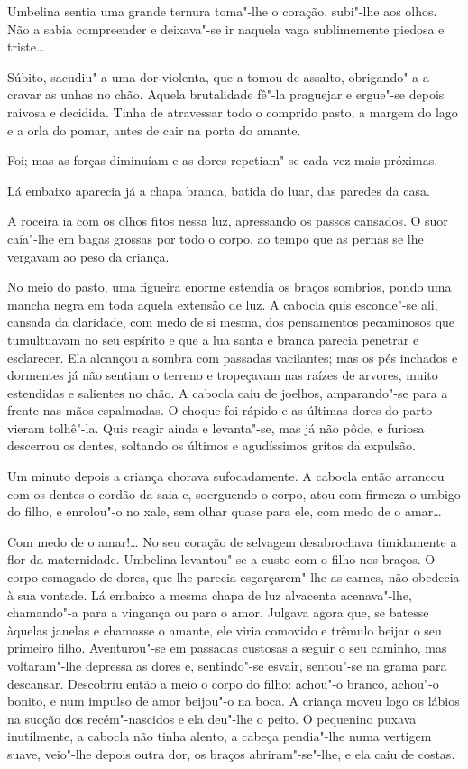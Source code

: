 Umbelina sentia uma grande ternura toma"-lhe o coração, subi"-lhe aos
olhos. Não a sabia compreender e deixava"-se ir naquela vaga sublimemente
piedosa e triste\ldots{}

Súbito, sacudiu"-a uma dor violenta, que a tomou de assalto, obrigando"-a
a cravar as unhas no chão. Aquela brutalidade fê"-la praguejar e
ergue"-se depois raivosa e decidida. Tinha de atravessar todo o comprido
pasto, a margem do lago e a orla do pomar, antes de cair na porta do
amante.

Foi; mas as forças diminuíam e as dores repetiam"-se cada vez mais
próximas.

Lá embaixo aparecia já a chapa branca, batida do luar, das paredes da
casa.

A roceira ia com os olhos fitos nessa luz, apressando os passos
cansados. O suor caía"-lhe em bagas grossas por todo o corpo, ao tempo
que as pernas se lhe vergavam ao peso da criança.

No meio do pasto, uma figueira enorme estendia os braços sombrios, pondo
uma mancha negra em toda aquela extensão de luz. A cabocla quis
esconde"-se ali, cansada da claridade, com medo de si mesma, dos
pensamentos pecaminosos que tumultuavam no seu espírito e que a lua
santa e branca parecia penetrar e esclarecer. Ela alcançou a sombra com
passadas vacilantes; mas os pés inchados e dormentes já não sentiam o
terreno e tropeçavam nas raízes de arvores, muito estendidas e salientes
no chão. A cabocla caiu de joelhos, amparando"-se para a frente nas mãos
espalmadas. O choque foi rápido e as últimas dores do parto vieram
tolhê"-la. Quis reagir ainda e levanta"-se, mas já não pôde, e furiosa
descerrou os dentes, soltando os últimos e agudíssimos gritos da
expulsão.

Um minuto depois a criança chorava sufocadamente. A cabocla então
arrancou com os dentes o cordão da saia e, soerguendo o corpo, atou com
firmeza o umbigo do filho, e enrolou"-o no xale, sem olhar quase para
ele, com medo de o amar\ldots{}

Com medo de o amar!\ldots{} No seu coração de selvagem desabrochava
timidamente a flor da maternidade. Umbelina levantou"-se a custo com o
filho nos braços. O corpo esmagado de dores, que lhe parecia
esgarçarem"-lhe as carnes, não obedecia à sua vontade. Lá embaixo a mesma
chapa de luz alvacenta acenava"-lhe, chamando"-a para a vingança ou para o
amor. Julgava agora que, se batesse àquelas janelas e chamasse o amante,
ele viria comovido e trêmulo beijar o seu primeiro filho. Aventurou"-se
em passadas custosas a seguir o seu caminho, mas voltaram"-lhe depressa
as dores e, sentindo"-se esvair, sentou"-se na grama para descansar.
Descobriu então a meio o corpo do filho: achou"-o branco, achou"-o bonito,
e num impulso de amor beijou"-o na boca. A criança moveu logo os lábios
na sucção dos recém"-nascidos e ela deu"-lhe o peito. O pequenino puxava
inutilmente, a cabocla não tinha alento, a cabeça pendia"-lhe numa
vertigem suave, veio"-lhe depois outra dor, os braços abriram"-se"-lhe, e
ela caiu de costas.

